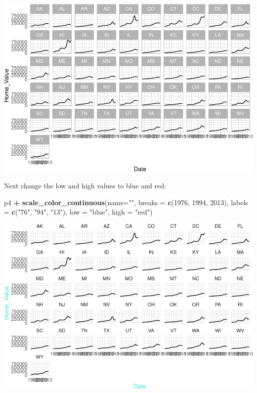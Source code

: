 \documentclass[
]{book}
\newenvironment{Shaded}{\begin{snugshade}}{\end{snugshade}}
\newcommand{\DataTypeTok}[1]{\textcolor[rgb]{0.13,0.29,0.53}{#1}}
\newcommand{\DecValTok}[1]{\textcolor[rgb]{0.00,0.00,0.81}{#1}}
\newcommand{\KeywordTok}[1]{\textcolor[rgb]{0.13,0.29,0.53}{\textbf{#1}}}
\newcommand{\NormalTok}[1]{#1}
\newcommand{\OperatorTok}[1]{\textcolor[rgb]{0.81,0.36,0.00}{\textbf{#1}}}
\newcommand{\StringTok}[1]{\textcolor[rgb]{0.31,0.60,0.02}{#1}}
\begin{document}
\includegraphics{R/Rgraphics/figures/unnamed-chunk-183-1.pdf}

Next change the low and high values to blue and red:

\begin{Shaded}
\begin{Highlighting}[]
\NormalTok{p4 }\OperatorTok{+}
\StringTok{  }\KeywordTok{scale\_color\_continuous}\NormalTok{(}\DataTypeTok{name=}\StringTok{""}\NormalTok{,}
                         \DataTypeTok{breaks =} \KeywordTok{c}\NormalTok{(}\DecValTok{1976}\NormalTok{, }\DecValTok{1994}\NormalTok{, }\DecValTok{2013}\NormalTok{),}
                         \DataTypeTok{labels =} \KeywordTok{c}\NormalTok{(}\StringTok{"\textquotesingle{}76"}\NormalTok{, }\StringTok{"\textquotesingle{}94"}\NormalTok{, }\StringTok{"\textquotesingle{}13"}\NormalTok{),}
                         \DataTypeTok{low =} \StringTok{"blue"}\NormalTok{, }\DataTypeTok{high =} \StringTok{"red"}\NormalTok{)}
\end{Highlighting}
\end{Shaded}

\includegraphics{R/Rgraphics/figures/unnamed-chunk-184-1.pdf}
\end{document}

